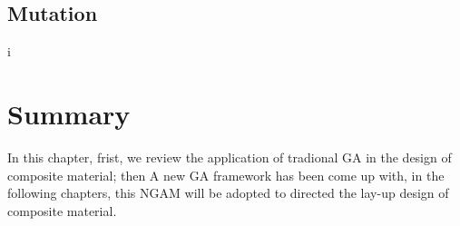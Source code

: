 \subsection{Mutation}
i


\section{Summary}
In this chapter, frist, we review the application of tradional GA in the design
of composite material; then A new GA framework has been come up with, in the
following chapters, this NGAM will be adopted to directed the lay-up design of
composite material.

